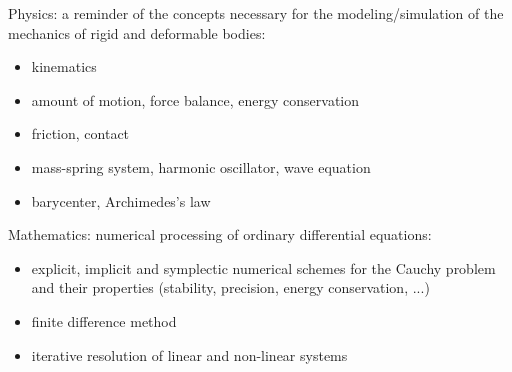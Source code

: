 Physics: a reminder of the concepts necessary for the modeling/simulation of the mechanics of rigid and deformable bodies:
\begin{itemize}
    \item kinematics
    \item amount of motion, force balance, energy conservation
    \item friction, contact
    \item mass-spring system, harmonic oscillator, wave equation
    \item barycenter, Archimedes's law
\end{itemize}
Mathematics: numerical processing of ordinary differential equations:
\begin{itemize}
    \item explicit, implicit and symplectic numerical schemes for the Cauchy problem and their properties (stability, precision, energy conservation, ...)
    \item finite difference method
    \item iterative resolution of linear and non-linear systems
\end{itemize}